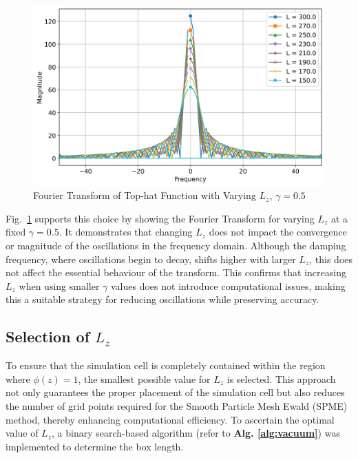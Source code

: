 
\begin{figure}[htbp]
  \centering
  \includegraphics[width=\linewidth]{images/fourieroftophatvaryL_gamma0.5.jpg}
  \caption{Fourier Transform of Top-hat Function with Varying $L_z$, $\gamma = 0.5$}
  \label{fig:fourieroftophatvaryL_gamma0}
\end{figure}


Fig.~\ref{fig:fourieroftophatvaryL_gamma0} supports this choice by showing the Fourier Transform for varying $L_z$ at a fixed $\gamma = 0.5$. It demonstrates that changing $L_z$ does not impact the convergence or magnitude of the oscillations in the frequency domain. Although the damping frequency, where oscillations begin to decay, shifts higher with larger $L_z$, this does not affect the essential behaviour of the transform. This confirms that increasing $L_z$ when using smaller $\gamma$ values does not introduce computational issues, making this a suitable strategy for reducing oscillations while preserving accuracy.

\subsection{Selection of  $L_z$}
To ensure that the simulation cell is completely contained within the region where $\phi(z) = 1$, the smallest possible value for $L_z$ is selected. This approach not only guarantees the proper placement of the simulation cell but also reduces the number of grid points required for the Smooth Particle Mesh Ewald (SPME) method, thereby enhancing computational efficiency. To ascertain the optimal value of $L_z$, a binary search-based algorithm (refer to \textbf{Alg. \ref{alg:vacuum}}) was implemented to determine the box length.
